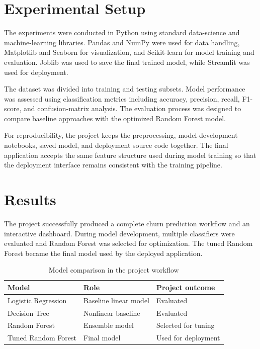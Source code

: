 \documentclass[conference]{IEEEtran}
\begin{document}
\section{Experimental Setup}
The experiments were conducted in Python using standard data-science and machine-learning libraries. Pandas and NumPy were used for data handling, Matplotlib and Seaborn for visualization, and Scikit-learn for model training and evaluation. Joblib was used to save the final trained model, while Streamlit was used for deployment.

The dataset was divided into training and testing subsets. Model performance was assessed using classification metrics including accuracy, precision, recall, F1-score, and confusion-matrix analysis. The evaluation process was designed to compare baseline approaches with the optimized Random Forest model.

For reproducibility, the project keeps the preprocessing, model-development notebooks, saved model, and deployment source code together. The final application accepts the same feature structure used during model training so that the deployment interface remains consistent with the training pipeline.

\clearpage
\section{Results}
The project successfully produced a complete churn prediction workflow and an interactive dashboard. During model development, multiple classifiers were evaluated and Random Forest was selected for optimization. The tuned Random Forest became the final model used by the deployed application.

\begin{table}[H]
\centering
\caption{Model comparison in the project workflow}
\label{tab:models}
\small
\begin{tabular}{p{2.3cm}p{2.0cm}p{2.3cm}}
\toprule
Model & Role & Project outcome \\
\midrule
Logistic Regression & Baseline linear model & Evaluated \\
Decision Tree & Nonlinear baseline & Evaluated \\
Random Forest & Ensemble model & Selected for tuning \\
Tuned Random Forest & Final model & Used for deployment \\
\bottomrule
\end{tabular}
\end{table}
\end{document}
